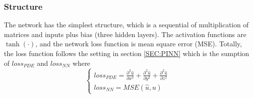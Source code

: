 \subsubsection{Structure}
The network has the simplest structure, which is a sequential of multiplication of matrices and inputs plus bias (three hidden layers).
The activation functions are $\tanh(\cdot)$, and the network loss function is mean square error (MSE).
Totally, the loss function follows the setting in section \ref{SEC:PINN} which is the sumption of $loss_{PDE}$ and $loss_{NN}$ where 
\begin{equation}
  \begin{cases}
    \displaystyle loss_{PDE} = \frac{\partial^2 \widehat{u}}{\partial x^2} + \frac{\partial^2 \widehat{u}}{\partial y^2} + \frac{\partial^2 \widehat{u}}{\partial z^2}  \\
    \displaystyle loss_{NN} = MSE(\widehat{u}, u)    
  \end{cases}
\end{equation}














